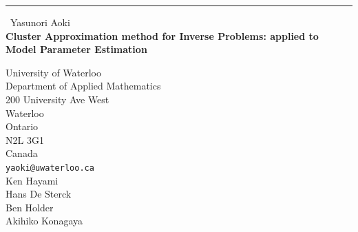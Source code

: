 \documentclass{report}
\begin{document}
\begin{center}
\rule{6in}{1pt} \
{\large Yasunori Aoki \\
{\bf Cluster Approximation method for Inverse Problems: applied to Model Parameter Estimation}}

University of Waterloo \\ Department of Applied Mathematics \\ 200 University Ave West \\ Waterloo \\ Ontario \\ N2L 3G1 \\ Canada
\\
{\tt yaoki@uwaterloo.ca}\\
Ken Hayami\\
Hans De Sterck\\
Ben Holder\\
Akihiko Konagaya\end{center}
\end{document}
